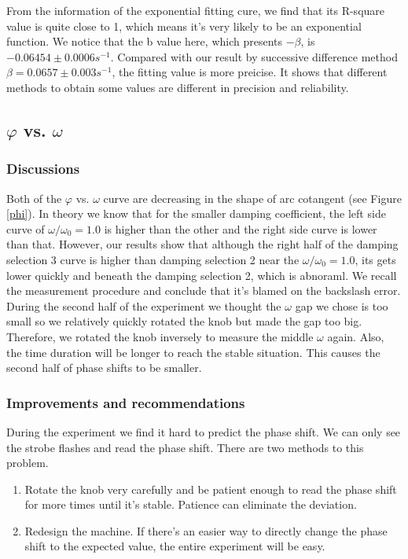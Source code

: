 
From the information of the exponential fitting cure, we find that its R-square
value is quite close to 1, which means it's very likely to be an exponential
function. We notice that the b value here, which presents $-\beta$, is
$-0.06454\pm 0.0006s^{-1}$. Compared with our result by successive difference
method $\beta=0.0657\pm 0.003s^{-1}$, the fitting value is more preicise. It
shows that different methods to obtain some values are different in precision
and reliability. 
	


\subsection{$\varphi$ vs. $\omega$}

\subsubsection{Discussions}

Both of the $\varphi$ vs. $\omega$ curve are decreasing in the shape of arc
cotangent (see Figure \ref{phi}). In theory we know that for the smaller damping
coefficient, the left side curve of $\omega/\omega_0=1.0$ is higher than the
other and the right side curve is lower than that. However, our results show
that although the right half of the damping selection 3 curve is higher than
damping selection 2 near the $\omega/\omega_0=1.0$, its gets lower quickly and
beneath the damping selection 2, which is abnoraml. We recall the measurement
procedure and conclude that it's blamed on the backslash error. During the
second half of the experiment we thought the $\omega$ gap we chose is too small
so we relatively quickly rotated the knob but made the gap too big. Therefore,
we rotated the knob inversely to measure the middle $\omega$ again. Also, the
time duration will be longer to reach the stable situation. This causes the
second half of phase shifts to be smaller. 

\subsubsection{Improvements and recommendations}

During the experiment we find it hard to predict the phase shift. We can only
see the strobe flashes and read the phase shift. There are two methods to this
problem. 

\begin{enumerate}
\item Rotate the knob very carefully and be patient enough to read the phase
  shift for more times until it's stable. Patience can eliminate the deviation. 
\item Redesign the machine. If there's an easier way to directly change the
  phase shift to the expected value, the entire experiment will be easy. 
\end{enumerate}

